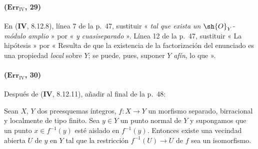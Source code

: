 \paragraph{($\mathbf{Err}_{\mathrm{IV}}$, 29)}
En (\textbf{IV}, 8.12.8), línea 7 de la p.~47, sustituir « \emph{tal que exista un $\sh{O}_Y$-módulo amplio} » por « \emph{y cuasiseparado} ». Línea 12 de la
p.~47, sustituir « La hipótesis » por « Resulta de
{} que la existencia de la
factorización del enunciado es una propiedad \emph{local} sobre $Y$; se puede,
pues, suponer $Y$ \emph{afín}, lo que ».

\paragraph{($\mathbf{Err}_{\mathrm{IV}}$, 30)}
Después de (\textbf{IV}, 8.12.11), añadir al final de la p.~48:

\begin{corollary}[8.12.12]
\label{IV.8.12.12}
Sean $X$, $Y$ dos preesquemas íntegros,
$f:X\to Y$ un morfismo separado, birracional y localmente de tipo finito.
Sea $y\in Y$ un punto normal de $Y$ y supongamos que un punto
$x\in f^{-1}(y)$ esté aislado en $f^{-1}(y)$. Entonces existe una
vecindad abierta $U$ de $y$ en $Y$ tal que la restricción
$f^{-1}(U)\to U$ de $f$ sea un isomorfismo.
\end{corollary}

